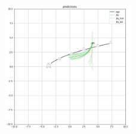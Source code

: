 \begin{figure}[!ht]
\begin{center}
\includegraphics[width=0.5\textwidth]{images/trajectron_misbehavior_2.jpeg}
\label{img:trajectron_misbehavior_2}
\end{center}
\end{figure}

